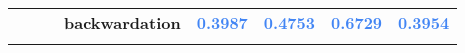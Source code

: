 \documentclass[
  authoryear,
  preprint,
  3p]{elsarticle}
\begin{document}
\begin{longtable}[t]{>{}l>{}l>{}l>{}r>{}r>{}r>{}r>{}r}
\textbf{} & \textbf{} & \textbf{} & \textbf{backwardation} & \textcolor[HTML]{4285f4}{\textbf{0.3987}} & \textcolor[HTML]{4285f4}{\textbf{0.4753}} & \textcolor[HTML]{4285f4}{\textbf{0.6729}} & \textcolor[HTML]{4285f4}{\textbf{0.3954}}\\
\textbf{\cellcolor{gray!10}{}} & \textbf{\cellcolor{gray!10}{}} & \textbf{\cellcolor{gray!10}{}} & \textbf{\cellcolor{gray!10}{contango}} & \textcolor[HTML]{4285f4}{\textbf{\cellcolor{gray!10}{0.4108}}} & \textcolor[HTML]{4285f4}{\textbf{\cellcolor{gray!10}{0.4652}}} & \textcolor[HTML]{4285f4}{\textbf{\cellcolor{gray!10}{0.6456}}} & \textcolor[HTML]{4285f4}{\textbf{\cellcolor{gray!10}{0.4797}}}\\
\bottomrule

\end{longtable}

\endgroup{}

\newpage

\begingroup\fontsize{7}{9}\selectfont
\end{document}
